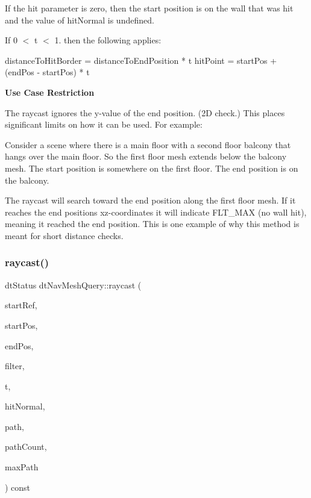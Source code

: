 If the hit parameter is zero, then the start position is on the wall that was hit and the value of {\ttfamily hit\+Normal} is undefined.

If 0 $<$ t $<$ 1. then the following applies\+:


\begin{DoxyCode}
distanceToHitBorder = distanceToEndPosition * t
hitPoint = startPos + (endPos - startPos) * t
\end{DoxyCode}


{\bfseries Use Case Restriction}

The raycast ignores the y-\/value of the end position. (2D check.) This places significant limits on how it can be used. For example\+:

Consider a scene where there is a main floor with a second floor balcony that hangs over the main floor. So the first floor mesh extends below the balcony mesh. The start position is somewhere on the first floor. The end position is on the balcony.

The raycast will search toward the end position along the first floor mesh. If it reaches the end position\textquotesingle{}s xz-\/coordinates it will indicate F\+L\+T\+\_\+\+M\+AX (no wall hit), meaning it reached the end position. This is one example of why this method is meant for short distance checks. \mbox{\label{classdtNavMeshQuery_a7509a4bf31a215f20478c5050ef25913}} 
\subsubsection{\texorpdfstring{raycast()}{raycast()}\hspace{0.1cm}{\footnotesize\ttfamily [2/4]}}
{\footnotesize\ttfamily dt\+Status dt\+Nav\+Mesh\+Query\+::raycast (\begin{DoxyParamCaption}\item[{\hyperlink{group__detour_gab4e0b2257a670c1a800057999612b466}{dt\+Poly\+Ref}}]{start\+Ref,  }\item[{const float $\ast$}]{start\+Pos,  }\item[{const float $\ast$}]{end\+Pos,  }\item[{const \hyperlink{classdtQueryFilter}{dt\+Query\+Filter} $\ast$}]{filter,  }\item[{float $\ast$}]{t,  }\item[{float $\ast$}]{hit\+Normal,  }\item[{\hyperlink{group__detour_gab4e0b2257a670c1a800057999612b466}{dt\+Poly\+Ref} $\ast$}]{path,  }\item[{int $\ast$}]{path\+Count,  }\item[{const int}]{max\+Path }\end{DoxyParamCaption}) const}

